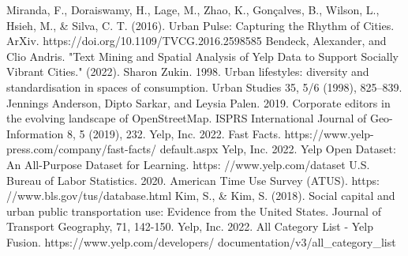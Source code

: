 \begin{thebibliography}{00}
 Miranda, F., Doraiswamy, H., Lage, M., Zhao, K., Gonçalves, B., Wilson, L., Hsieh, M., \& Silva, C. T. (2016). Urban Pulse: Capturing the Rhythm of Cities. ArXiv. https://doi.org/10.1109/TVCG.2016.2598585
 Bendeck, Alexander, and Clio Andris. "Text Mining and Spatial Analysis of Yelp Data to Support Socially Vibrant Cities." (2022).
 Sharon Zukin. 1998. Urban lifestyles: diversity and standardisation in spaces of
consumption. Urban Studies 35, 5/6 (1998), 825–839.
 Jennings Anderson, Dipto Sarkar, and Leysia Palen. 2019. Corporate editors
in the evolving landscape of OpenStreetMap. ISPRS International Journal of
Geo-Information 8, 5 (2019), 232.
Yelp, Inc. 2022. Fast Facts. https://www.yelp-press.com/company/fast-facts/
default.aspx
 Yelp, Inc. 2022. Yelp Open Dataset: An All-Purpose Dataset for Learning. https:
//www.yelp.com/dataset
 U.S. Bureau of Labor Statistics. 2020. American Time Use Survey (ATUS). https:
//www.bls.gov/tus/database.html
 Kim, S., \& Kim, S. (2018). Social capital and urban public transportation use: Evidence from the United States. Journal of Transport Geography, 71, 142-150.
 Yelp, Inc. 2022. All Category List - Yelp Fusion. https://www.yelp.com/developers/
documentation/v3/all\_category\_list
\end{thebibliography}